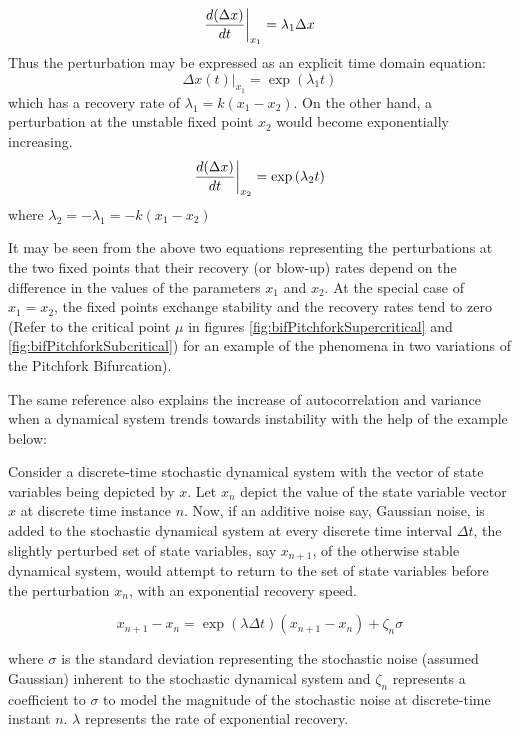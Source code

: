 \begin{equation}
	\evalat[\bigg]{\frac{d(\Delta x)}{dt}}{x_1} = \lambda_1 \Delta x 
\end{equation}
Thus the perturbation may be expressed as an explicit time domain equation:
\begin{equation}
	\Delta x(t)|_{x_1} = \exp{(\lambda_1 t)}
\end{equation}
which has a recovery rate of $\lambda_1 = k(x_1-x_2)$. On the other hand, a perturbation at the unstable fixed point $x_2$ would become exponentially increasing.
\begin{equation}
	\evalat[\bigg]{\frac{d(\Delta x)}{dt}}{x_2} = \exp{(\lambda_2 t)}
\end{equation}
 \hspace{25pt} where $\lambda_2 = -\lambda_1 = -k(x_1-x_2)$
 
It may be seen from the above two equations representing the perturbations at the two fixed points that their recovery (or blow-up) rates depend on the difference in the values of the parameters $x_1$ and $x_2$. At the special case of $x_1 = x_2$, the fixed points exchange stability and the recovery rates tend to zero (Refer to the critical point $\mu$ in figures \ref{fig:bifPitchforkSupercritical} and \ref{fig:bifPitchforkSubcritical}) for an example of the phenomena in two variations of the Pitchfork Bifurcation).
 
The same reference \cite{schefferEarlyWarningSignalsForCriticalTransitions} also explains the increase of autocorrelation and variance when a dynamical system trends towards instability with the help of the example below:

Consider a discrete-time stochastic dynamical system with the vector of state variables being depicted by $x$. Let $x_n$ depict the value of the state variable vector $x$ at discrete time instance $n$.
Now, if an additive noise say, Gaussian noise, is added to the stochastic dynamical system at every discrete time interval $\Delta t$, the slightly perturbed set of state variables, say $x_{n+1}$, of the otherwise stable dynamical system, would attempt to return to the set of state variables before the perturbation $x_n$, with an exponential recovery speed.

\begin{equation}
	x_{n+1} - x_{n} = \exp{(\lambda \Delta t)}(x_{n+1}-x_{n}) + \zeta_n\sigma
\end{equation}

\hspace{25pt} where $\sigma$ is the standard deviation representing the stochastic noise (assumed Gaussian) inherent to the stochastic dynamical system and $\zeta_n$ represents a coefficient to $\sigma$ to model the magnitude of the stochastic noise at discrete-time instant $n$. $\lambda$ represents the rate of exponential recovery.

